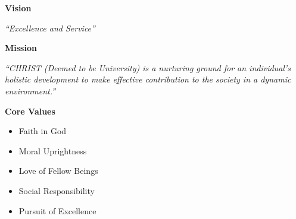 
\clearpage
\thispagestyle{empty}

\begingroup
\centering

{\Large\bfseries Vision}\par\vspace{0.75em}
\emph{``Excellence and Service''}\par\vspace{1.5em}

{\Large\bfseries Mission}\par\vspace{0.75em}
\begin{minipage}{0.85\textwidth}
\centering
\emph{``CHRIST (Deemed to be University) is a nurturing ground for an individual's holistic development to make effective contribution to the society in a dynamic environment.''}
\end{minipage}\par\vspace{1.75em}

{\Large\bfseries Core Values}\par\vspace{0.75em}
\begin{minipage}{0.6\textwidth}
\raggedright
\begin{itemize}
\item Faith in God
\item Moral Uprightness
\item Love of Fellow Beings
\item Social Responsibility
\item Pursuit of Excellence
\end{itemize}
\end{minipage}

\endgroup
\clearpage
